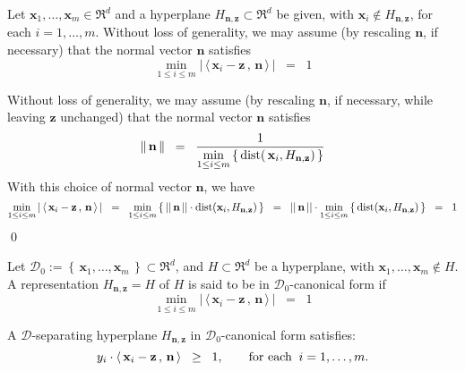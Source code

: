 \documentclass{article}
\begin{document}
\vskip 0.5cm
\begin{lemma}\quad
Let $\mathbf{x}_{1},\ldots,\mathbf{x}_{m}\in\Re^{d}$ and a hyperplane $H_{\mathbf{n},\mathbf{z}} \subset \Re^{d}$ be given, with $\mathbf{x}_{i} \notin H_{\mathbf{n},\mathbf{z}}$, for each $i = 1,\ldots,m$.  Without loss of generality, we may assume (by rescaling $\mathbf{n}$, if necessary) that the normal vector $\mathbf{n}$ satisfies
\begin{equation*}
\underset{1\leq i \leq m}{\min}\left\vert\,\langle\,\mathbf{x}_{i} - \mathbf{z} \,,\, \mathbf{n}\,\rangle\,\right\vert \;\; = \;\; 1
\end{equation*}
\end{lemma}
\proof
Without loss of generality, we may assume (by rescaling $\mathbf{n}$, if necessary, while leaving $\mathbf{z}$ unchanged) that the normal vector $\mathbf{n}$ satisfies
\begin{equation*}
\Vert\,\mathbf{n}\,\Vert \;\; = \;\; \dfrac{1}{\underset{1\leq i \leq m}{\min}\left\{\,\textnormal{dist}\!\left(\,\mathbf{x}_{i},H_{\mathbf{n},\mathbf{z}}\right)\,\right\}}
\end{equation*}
With this choice of normal vector $\mathbf{n}$, we have
\begin{equation*}
\underset{1\leq i \leq m}{\min}\left\vert\,\langle\,\mathbf{x}_{i} - \mathbf{z} \,,\, \mathbf{n}\,\rangle\,\right\vert
\;\; = \;\;
\underset{1\leq i \leq m}{\min}\left\{\,||\,\mathbf{n}\,||\cdot\textnormal{dist}\!\left(\mathbf{x}_{i},H_{\mathbf{n},\mathbf{z}}\right)\,\right\}
\;\; = \;\;
||\,\mathbf{n}\,||\cdot\underset{1\leq i \leq m}{\min}\left\{\,\textnormal{dist}\!\left(\mathbf{x}_{i},H_{\mathbf{n},\mathbf{z}}\right)\,\right\}
\;\; = \;\; 1
\end{equation*}
\qed

\begin{definition}\quad
Let $\mathcal{D}_{0} := \left\{\,\mathbf{x}_{1},\ldots,\mathbf{x}_{m}\,\right\} \subset \Re^{d}$, and $H \subset \Re^{d}$ be a hyperplane, with $\mathbf{x}_{1}, \ldots, \mathbf{x}_{m} \notin H$.  A representation $H_{\mathbf{n},\mathbf{z}} = H$ of $H$ is said to be in $\mathcal{D}_{0}$-canonical form if
\begin{equation*}
\underset{1\leq i \leq m}{\min}\left\vert\,\langle\,\mathbf{x}_{i} - \mathbf{z} \,,\, \mathbf{n}\,\rangle\,\right\vert \;\; = \;\; 1
\end{equation*}
\end{definition}

\vskip 0.5cm
\begin{corollary}\quad
A $\mathcal{D}$-separating hyperplane $H_{\mathbf{n},\mathbf{z}}$ in $\mathcal{D}_{0}$-canonical form satisfies:
\begin{equation*}
y_{i}\cdot\langle\,\mathbf{x}_{i}-\mathbf{z}\,,\,\mathbf{n}\,\rangle \;\; \geq \;\; 1,
\quad\quad
\textnormal{for each} \;\; i = 1, \ldots, m.
\end{equation*}
\end{corollary}
\end{document}
